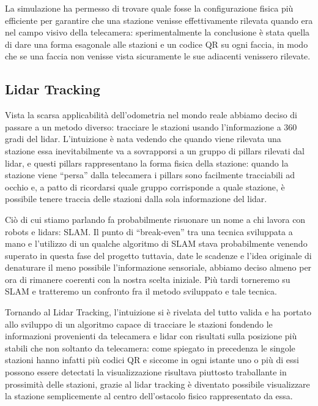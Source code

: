 \documentclass{Configuration_Files/PoliMi3i_thesis}
\begin{document}
La simulazione ha permesso di trovare quale fosse la configurazione fisica più efficiente per garantire che una stazione venisse effettivamente rilevata quando era nel campo visivo della telecamera: sperimentalmente la conclusione è stata quella di dare una forma esagonale alle stazioni e un codice QR su ogni faccia, in modo che se una faccia non venisse vista sicuramente le sue adiacenti venissero rilevate.

\subsection{Lidar Tracking}

Vista la scarsa applicabilità dell’odometria nel mondo reale abbiamo deciso di passare a un metodo diverso: tracciare le stazioni usando l’informazione a 360 gradi del lidar. L’intuizione è nata vedendo che quando viene rilevata una stazione essa inevitabilmente va a sovrapporsi a un gruppo di pillars rilevati dal lidar, e questi pillars rappresentano la forma fisica della stazione: quando la stazione viene “persa” dalla telecamera i pillars sono facilmente tracciabili ad occhio e, a patto di ricordarsi quale gruppo corrisponde a quale stazione, è possibile tenere traccia delle stazioni dalla sola informazione del lidar.

Ciò di cui stiamo parlando fa probabilmente risuonare un nome a chi lavora con robots e lidars: SLAM. Il punto di “break-even” tra una tecnica sviluppata a mano e l’utilizzo di un qualche algoritmo di SLAM stava probabilmente venendo superato in questa fase del progetto tuttavia, date le scadenze e l’idea originale di denaturare il meno possibile l’informazione sensoriale, abbiamo deciso almeno per ora di rimanere coerenti con la nostra scelta iniziale. Più tardi torneremo su SLAM e tratteremo un confronto fra il metodo sviluppato e tale tecnica.

Tornando al Lidar Tracking, l’intuizione si è rivelata del tutto valida e ha portato allo sviluppo di un algoritmo capace di tracciare le stazioni fondendo le informazioni provenienti da telecamera e lidar con risultati sulla posizione più stabili che non soltanto da telecamera: come spiegato in precedenza le singole stazioni hanno infatti più codici QR e siccome in ogni istante uno o più di essi possono essere detectati la visualizzazione risultava piuttosto traballante in prossimità delle stazioni, grazie al lidar tracking è diventato possibile visualizzare la stazione semplicemente al centro dell’ostacolo fisico rappresentato da essa.
\end{document}
